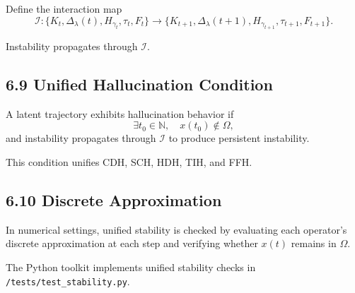 Define the interaction map
\[
\mathcal{I} : \{K_t, \Delta_\lambda(t), H_{\gamma_t}, \tau_t, F_t\}
\to \{K_{t+1}, \Delta_\lambda(t+1), H_{\gamma_{t+1}}, \tau_{t+1}, F_{t+1}\}.
\]

Instability propagates through $\mathcal{I}$.

\subsection*{6.9 Unified Hallucination Condition}

A latent trajectory exhibits hallucination behavior if
\[
\exists t_0 \in \mathbb{N}, \quad
x(t_0) \notin \Omega,
\]
and instability propagates through $\mathcal{I}$ to produce persistent
instability.

This condition unifies CDH, SCH, HDH, TIH, and FFH.

\subsection*{6.10 Discrete Approximation}

In numerical settings, unified stability is checked by evaluating each
operator’s discrete approximation at each step and verifying whether
$x(t)$ remains in $\Omega$.

The Python toolkit implements unified stability checks in
\texttt{/tests/test\_stability.py}.

